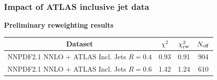 \documentclass[10pt]{beamer}
\begin{document}
\begin{frame}
\frametitle{Impact of ATLAS inclusive jet data}
\textbf{\footnotesize Preliminary reweighting results}


\begin{table}[h]
\small
\begin{center}
\begin{tabular}{|c|c|c|c|}
\hline
Dataset  &  $\chi^2$  &  $\chi^2_{\rm rw} $ & $N_{\rm eff}$  \\
\hline
NNPDF2.1 NNLO + ATLAS Incl. Jets     $R=0.4$   & 0.93  & 0.91 & 904       \\  
NNPDF2.1 NNLO + ATLAS Incl. Jets    $R=0.6$   & 1.42  & 1.24 &  610     \\  
\hline
\end{tabular}
\end{center}

\end{table}


\begin{figure}[h!]
  \centering
\end{figure}

\end{frame}
 
\end{document}
